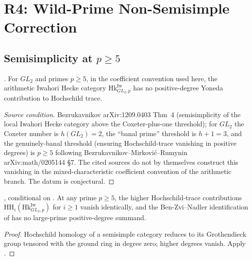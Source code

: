 \section{R4: Wild-Prime Non-Semisimple Correction}
\label{v4-arith:bzn-rcompletion:R4}

\subsection{Semisimplicity at \(p\geq 5\)}

\begin{theorem}
\label{v4-arith:bzn-rcompletion:thm:bez-ss-large-p}
\ClaimStatusConjectured. For \(GL_{2}\) and primes \(p\geq 5\), in the
coefficient convention used here, the arithmetic Iwahori Hecke category
\(\mathrm{Hk}^{\mathrm{Iw}}_{GL_{2},p}\) has no positive-degree Yoneda
contribution to Hochschild trace.
\end{theorem}

\begin{proof}[Source condition]
Bezrukavnikov arXiv:1209.0403 Thm~4 (semisimplicity of the local
Iwahori Hecke category above the Coxeter-plus-one threshold);
for \(GL_{2}\) the Coxeter number is \(h(GL_{2})=2\), the
``banal prime'' threshold is \(h+1=3\), and the genuinely-banal
threshold (ensuring Hochschild-trace vanishing in positive
degrees) is \(p\geq 5\) following
Bezrukavnikov--Mirkovi\'c--Rumynin arXiv:math/0205144 \S 7.
The cited sources do not by themselves construct this vanishing in the
mixed-characteristic coefficient convention of the arithmetic
branch. The datum is conjectural.
\end{proof}

\begin{corollary}
\label{v4-arith:bzn-rcompletion:cor:vanishing-at-large-p}
\ClaimStatusProvedHereConditional, conditional on
. At any prime
\(p\geq 5\), the higher
Hochschild-trace contributions
\(\mathrm{HH}_{i}(\mathrm{Hk}^{\mathrm{Iw}}_{GL_{2},p})\) for
\(i\geq 1\) vanish identically, and the Ben-Zvi--Nadler
identification of
 has no large-prime
positive-degree summand.
\end{corollary}

\begin{proof}
Hochschild homology of a semisimple category reduces to its
Grothendieck group tensored with the ground ring in degree zero;
higher degrees vanish. Apply
.
\end{proof}

